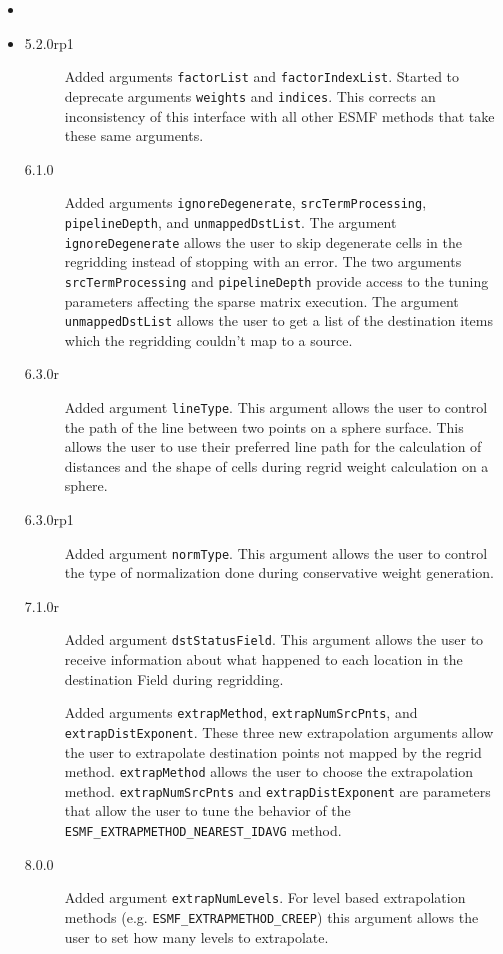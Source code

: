    \begin{itemize}
   \item{}
   \item{}
   \begin{description}
   \item[5.2.0rp1] Added arguments {\tt factorList} and {\tt factorIndexList}.
                   Started to deprecate arguments {\tt weights} and {\tt indices}.
                   This corrects an inconsistency of this interface with all
                   other ESMF methods that take these same arguments.
   \item[6.1.0] Added arguments {\tt ignoreDegenerate}, {\tt srcTermProcessing},
                {\tt pipelineDepth}, and {\tt unmappedDstList}.
                The argument {\tt ignoreDegenerate} allows the user to skip degenerate
                cells in the regridding instead of stopping with an error.
                The two arguments {\tt srcTermProcessing} and {\tt pipelineDepth}
                provide access to the tuning parameters affecting the sparse matrix
                execution. The argument {\tt unmappedDstList} allows the user to
                get a list of the destination items which the regridding couldn't
                map to a source.
   \item[6.3.0r] Added argument {\tt lineType}. This argument allows the user to
                 control the path of the line between two points on a sphere surface.
                 This allows the user to use their preferred line path for the calculation
                 of distances and the shape of cells during regrid weight calculation on
                 a sphere.
   \item[6.3.0rp1] Added argument {\tt normType}. This argument allows the user to
                 control the type of normalization done during conservative weight generation.
   \item[7.1.0r] Added argument {\tt dstStatusField}. This argument allows the user to
                receive information about what happened to each location in the destination
                Field during regridding.
  
                Added arguments {\tt extrapMethod}, {\tt extrapNumSrcPnts}, and
                {\tt extrapDistExponent}. These three new extrapolation arguments allow the 
                user to extrapolate destination points not mapped by the regrid method. 
                {\tt extrapMethod} allows the user to choose the extrapolation method.
                {\tt extrapNumSrcPnts} and {\tt extrapDistExponent} are parameters that
                allow the user to tune the behavior of the {\tt ESMF\_EXTRAPMETHOD\_NEAREST\_IDAVG} 
                method.
   \item[8.0.0] Added argument {\tt extrapNumLevels}. For level based extrapolation methods
                (e.g. {\tt ESMF\_EXTRAPMETHOD\_CREEP}) this argument allows the user to
                set how many levels to extrapolate. 
                
   \end{description}
   \end{itemize}
  
